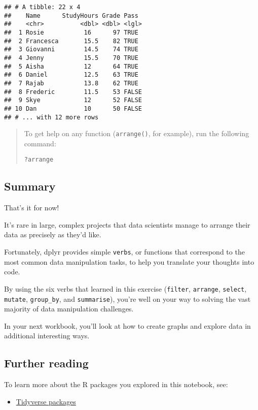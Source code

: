 \documentclass[
]{article}
\providecommand{\tightlist}{%
  \setlength{\itemsep}{0pt}\setlength{\parskip}{0pt}}
\begin{document}
\begin{verbatim}
## # A tibble: 22 x 4
##    Name      StudyHours Grade Pass 
##    <chr>          <dbl> <dbl> <lgl>
##  1 Rosie           16      97 TRUE 
##  2 Francesca       15.5    82 TRUE 
##  3 Giovanni        14.5    74 TRUE 
##  4 Jenny           15.5    70 TRUE 
##  5 Aisha           12      64 TRUE 
##  6 Daniel          12.5    63 TRUE 
##  7 Rajab           13.8    62 TRUE 
##  8 Frederic        11.5    53 FALSE
##  9 Skye            12      52 FALSE
## 10 Dan             10      50 FALSE
## # ... with 12 more rows
\end{verbatim}

\begin{quote}
To get help on any function (\texttt{arrange()}, for example), run the
following command:

\texttt{?arrange}
\end{quote}

\hypertarget{summary}{%
\subsection{Summary}\label{summary}}

That's it for now!

It's rare in large, complex projects that data scientists manage to
arrange their data as precisely as they'd like.

Fortunately, dplyr provides simple \texttt{verbs}, or functions that
correspond to the most common data manipulation tasks, to help you
translate your thoughts into code.

By using the six verbs that learned in this exercise (\texttt{filter},
\texttt{arrange}, \texttt{select}, \texttt{mutate}, \texttt{group\_by},
and \texttt{summarise}), you're well on your way to solving the vast
majority of data manipulation challenges.

In your next workbook, you'll look at how to create graphs and explore
data in additional interesting ways.

\hypertarget{further-reading}{%
\subsection{Further reading}\label{further-reading}}

To learn more about the R packages you explored in this notebook, see:

\begin{itemize}
\tightlist
\item
  \href{https://www.tidyverse.org/packages/}{Tidyverse packages}
\end{itemize}
\end{document}
